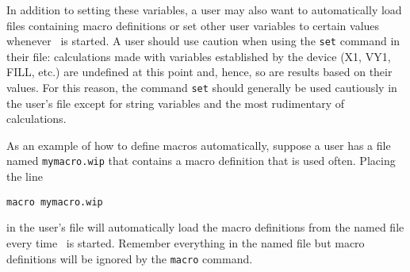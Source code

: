 In addition to setting these variables, a user may also
want to
automatically load files containing
macro%
definitions
or set other user variables
to certain values whenever \wip\ is
started.
A user should use caution when using
the {\tt set} command in their \wipinit file:
calculations made with variables established by the device
(\eg X1, VY1, FILL, etc.) are undefined at this
point and, hence, so are results based on their values.
For this reason, the command {\tt set} should generally be used
cautiously in the user's \wipinit file except for string variables and
the most rudimentary of calculations.

As an example of how to define macros automatically,
suppose a user has a file named {\tt mymacro.wip} that
contains a macro definition that is used often.
Placing the line
\begin{wiplist}%
  \item[\ ] {\tt macro mymacro.wip}
\end{wiplist}
in the user's \wipinit file will automatically load the
macro definitions from the named file every time \wip\ is started.
Remember everything in the named file but macro definitions
will be ignored by the {\tt macro} command.

